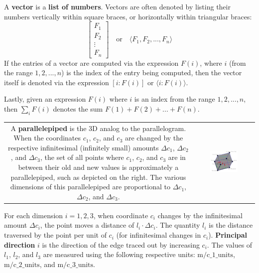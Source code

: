 \documentclass{book}
\begin{document}
A \textbf{vector} is a {\bf list of numbers}. Vectors are often denoted by listing their numbers vertically within square braces, or horizontally within triangular braces: 
\[\begin{bmatrix} F_1 \\ F_2 \\ \vdots \\ F_n \end{bmatrix} \quad\text{or}\quad \langle F_1, F_2, ..., F_n \rangle\]
If the entries of a vector are computed via the expression \(F(i)\), where \(i\) (from the range \(1, 2, ..., n\)) is the index of the entry being computed, then the vector itself is denoted via the expression \([i : F(i)]\) or \(\langle i : F(i) \rangle\).

Lastly, given an expression \(F(i)\) where \(i\) is an index from the range \(1, 2, ..., n\), then \(\sum_i F(i)\) denotes the sum \(F(1) + F(2) + ... + F(n)\).

\vspace{1mm}

\begin{tabular}{cc}
\parbox{0.5\textwidth}{
A {\bf parallelepiped} is the 3D analog to the parallelogram. When the coordinates \(c_1\), \(c_2\), and \(c_3\) are changed by the respective infinitesimal (infinitely small) amounts \(\Delta c_1\), \(\Delta c_2\), and \(\Delta c_3\), the set of all points where \(c_1\), \(c_2\), and \(c_3\) are in between their old and new values is approximately a parallelepiped, such as depicted on the right. The various dimensions of this parallelepiped are proportional to \(\Delta c_1\), \(\Delta c_2\), and \(\Delta c_3\). 
} & \parbox{0.5\textwidth}{
\includegraphics[width = 0.5\textwidth]{Coordinate_systems/coordinate_system_cell}
}
\end{tabular}

\vspace{1mm}

For each dimension \(i = 1, 2, 3\), when coordinate \(c_i\) changes by the infinitesimal amount \(\Delta c_i\), the point moves a distance of \(l_i \cdot \Delta c_i\). The quantity \(l_i\) is the distance traversed by the point per unit of \(c_i\) (for infinitesimal changes in \(c_i\)). {\bf Principal direction} \(i\) is the direction of the edge traced out by increasing \(c_i\). The values of \(l_1\), \(l_2\), and \(l_3\) are measured using the following respective units: \(\text{m}/\text{c\_1\_units}\), \(\text{m}/\text{c\_2\_units}\), and \(\text{m}/\text{c\_3\_units}\).   
\end{document}

